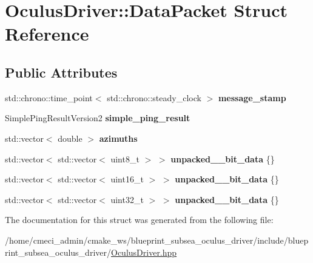 \hypertarget{structOculusDriver_1_1DataPacket}{}\section{Oculus\+Driver\+:\+:Data\+Packet Struct Reference}
\label{structOculusDriver_1_1DataPacket}
\subsection*{Public Attributes}
\begin{DoxyCompactItemize}
\item 
\mbox{\label{structOculusDriver_1_1DataPacket_ab4cd8be7c0ec648023717dcb2d1fe286}} 
std\+::chrono\+::time\+\_\+point$<$ std\+::chrono\+::steady\+\_\+clock $>$ {\bfseries message\+\_\+stamp}
\item 
\mbox{\label{structOculusDriver_1_1DataPacket_ae69a4150d08f3bbe1e6bba90393e7390}} 
Simple\+Ping\+Result\+Version2 {\bfseries simple\+\_\+ping\+\_\+result}
\item 
\mbox{\label{structOculusDriver_1_1DataPacket_a87b12764cc00be9418a2174f8a67c056}} 
std\+::vector$<$ double $>$ {\bfseries azimuths}
\item 
\mbox{\label{structOculusDriver_1_1DataPacket_ae8a95258c310b6076053297e9e1f964a}} 
std\+::vector$<$ std\+::vector$<$ uint8\+\_\+t $>$ $>$ {\bfseries unpacked\+\_\+\_\+bit\+\_\+data} \{\}
\item 
\mbox{\label{structOculusDriver_1_1DataPacket_a5b3b9d086f9e4803d24680dbee7cb42e}} 
std\+::vector$<$ std\+::vector$<$ uint16\+\_\+t $>$ $>$ {\bfseries unpacked\+\_\+\_\+bit\+\_\+data} \{\}
\item 
\mbox{\label{structOculusDriver_1_1DataPacket_a8ce32e0ba23005ae47334263234e81fc}} 
std\+::vector$<$ std\+::vector$<$ uint32\+\_\+t $>$ $>$ {\bfseries unpacked\+\_\+\_\+bit\+\_\+data} \{\}
\end{DoxyCompactItemize}


The documentation for this struct was generated from the following file\+:\begin{DoxyCompactItemize}
\item 
/home/cmeci\+\_\+admin/cmake\+\_\+ws/blueprint\+\_\+subsea\+\_\+oculus\+\_\+driver/include/blueprint\+\_\+subsea\+\_\+oculus\+\_\+driver/\hyperlink{OculusDriver_8hpp}{Oculus\+Driver.\+hpp}\end{DoxyCompactItemize}
